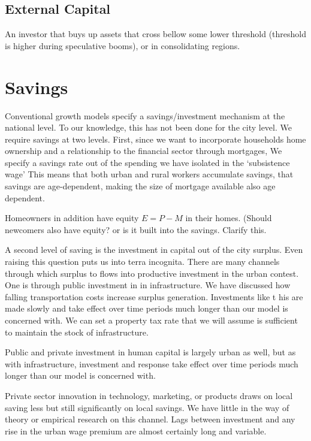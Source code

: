  \subsection{External Capital}
 An investor that buys up assets that cross bellow some lower threshold (threshold is higher during speculative booms), or in consolidating regions.



\section{Savings}
Conventional growth models specify a savings/investment mechanism at the national level. To our knowledge, this has not been done for the city level. We require  savings at two levels. First, since we want to incorporate  households home ownership and a relationship to the financial sector through mortgages, We specify a savings rate out of the spending we have isolated in the `subsistence wage' This means that both urban and rural workers accumulate savings, that savings are age-dependent, making the size of mortgage available also age dependent. 

Homeowners in addition have equity $E=P-M$ in their homes.  ({\color{red}Should newcomers also have equity? or is it built into the savings. Clarify this.} 

A second level of saving is the  investment in capital out of the city surplus. Even raising this question puts us into terra incognita. There are many  channels through which surplus to flows into productive investment in the urban contest. One is through public investment in in infrastructure. We have discussed how falling transportation costs increase surplus generation. Investments like t his are made slowly and take effect over time periods much longer than our model is concerned with.  We can set a property tax rate   that we will assume is sufficient to maintain the stock of infrastructure.

Public and private investment in human capital is largely urban as well, but as with infrastructure, investment and response take effect over time periods much longer than our model is concerned with. 

Private sector innovation in technology, marketing, or products draws on local saving less but still significantly on local savings. We have little in the way of theory or empirical research on this channel. Lags between investment and any rise in the urban wage premium are almost certainly long and variable. 

